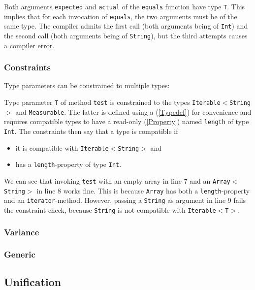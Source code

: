\documentclass{article}
\newcommand{\type}[1]{\texttt{#1}}
\newcommand{\expr}[1]{\texttt{#1}}
\newcommand{\fullref}[1]{\nameref{#1} (\cref{#1})}
\begin{document}

Both arguments \expr{expected} and \expr{actual} of the \expr{equals} function have type \type{T}. This implies that for each invocation of \expr{equals}, the two arguments must be of the same type. The compiler admits the first call (both arguments being of \type{Int}) and the second call (both arguments being of \type{String}), but the third attempts causes a compiler error.


\subsubsection{Constraints}
\label{Constraints}

Type parameters can be constrained to multiple types:


Type parameter \type{T} of method \expr{test} is constrained to the types \type{Iterable$<$String$>$} and \type{Measurable}. The latter is defined using a \fullref{Typedef} for convenience and requires compatible types to have a read-only \fullref{Property} named \expr{length} of type \type{Int}. The constraints then say that a type is compatible if

\begin{itemize}
	\item it is compatible with \type{Iterable$<$String$>$} and
	\item has a \expr{length}-property of type \type{Int}.
\end{itemize}
We can see that invoking \expr{test} with an empty array in line 7 and an \type{Array$<$String$>$} in line 8 works fine. This is because \type{Array} has both a \expr{length}-property and an \expr{iterator}-method. However, passing a \type{String} as argument in line 9 fails the constraint check, because \type{String} is not compatible with \type{Iterable$<$T$>$}. 


\subsubsection{Variance}
\label{Variance}

\subsubsection{Generic}
\label{Generic}




\subsection{Unification}
\label{Unification}
\end{document}
